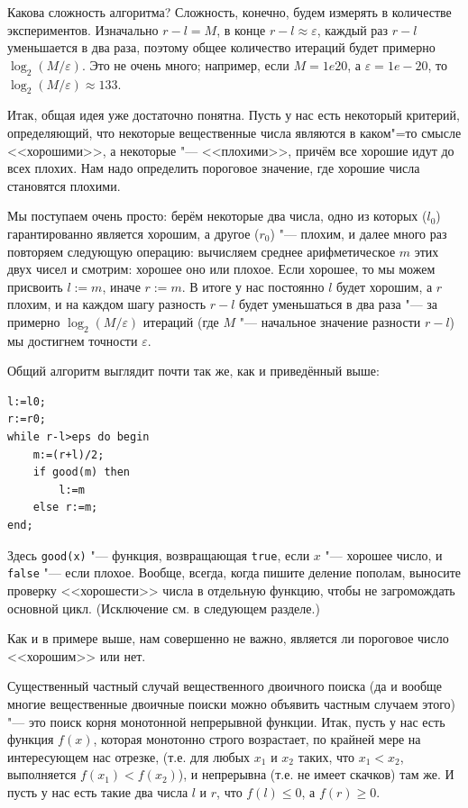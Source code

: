 \documentclass[a4paper,10pt]{problems}
\let\eps\varepsilon
\begin{document}
Какова сложность алгоритма? Сложность, конечно, будем измерять в количестве экспериментов.
Изначально $r-l=M$, в конце $r-l\approx \eps$, каждый раз $r-l$ уменьшается в два раза,
поэтому общее количество итераций будет примерно $\log_2 (M/\eps)$. 
Это не очень много; например, если $M=1e20$, а $\eps=1e-20$, то $\log_2 (M/\eps)\approx 133$.

Итак, общая идея уже достаточно понятна. 
Пусть у нас есть некоторый критерий, определяющий, что некоторые вещественные числа являются в каком"=то смысле <<хорошими>>, а некоторые "--- <<плохими>>,
причём все хорошие идут до всех плохих. 
Нам надо определить пороговое значение, где хорошие числа становятся плохими.

Мы поступаем очень просто: берём некоторые два числа, одно из которых ($l_0$) гарантированно является хорошим, а другое ($r_0$) "--- плохим,
и далее много раз повторяем следующую операцию: вычисляем среднее арифметическое $m$ этих двух чисел и смотрим: хорошее оно или плохое.
Если хорошее, то мы можем присвоить $l:=m$, иначе $r:=m$. 
В итоге у нас постоянно $l$ будет хорошим, а $r$ плохим, и на каждом шагу разность $r-l$ будет уменьшаться в два раза 
"--- за примерно $\log_2(M/\eps)$ итераций (где $M$ "--- начальное значение разности $r-l$) мы достигнем точности $\eps$.

Общий алгоритм выглядит почти так же, как и приведённый выше:
\begin{codesampleo}\begin{verbatim}
l:=l0;
r:=r0;
while r-l>eps do begin    
    m:=(r+l)/2;
    if good(m) then
        l:=m
    else r:=m;
end;
\end{verbatim}
\end{codesampleo}

Здесь \verb`good(x)` "--- функция, возвращающая \verb`true`, если $x$ "--- хорошее число, и \verb`false` "--- если плохое. 
Вообще, всегда, когда пишите деление пополам, выносите проверку <<хорошести>> числа в отдельную функцию, чтобы не загромождать основной цикл.
(Исключение см. в следующем разделе.)

Как и в примере выше, нам совершенно не важно, является ли пороговое число <<хорошим>> или нет.

Существенный частный случай вещественного двоичного поиска (да и вообще многие вещественные двоичные поиски можно объявить частным случаем этого)
"--- это поиск корня монотонной непрерывной функции.
Итак, пусть у нас есть функция $f(x)$, которая монотонно строго возрастает, по крайней мере на интересующем нас отрезке, (т.е. для любых $x_1$ и $x_2$ таких, что $x_1<x_2$, выполняется $f(x_1)<f(x_2)$),
и непрерывна (т.е. не имеет скачков) там же.
И пусть у нас есть такие два числа $l$ и $r$, что $f(l)\leq0$, а $f(r)\geq0$.
\end{document}
